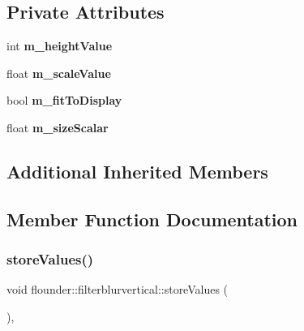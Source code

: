 \subsection*{Private Attributes}
\begin{DoxyCompactItemize}
\item 
\mbox{\label{classflounder_1_1filterblurvertical_ae12de62dab1a199092838d7d8401904a}} 
int {\bfseries m\+\_\+height\+Value}
\item 
\mbox{\label{classflounder_1_1filterblurvertical_a0fffea96668635a54361a32fe065848a}} 
float {\bfseries m\+\_\+scale\+Value}
\item 
\mbox{\label{classflounder_1_1filterblurvertical_a9c94d85b9b6a6870f0202d95b1753850}} 
bool {\bfseries m\+\_\+fit\+To\+Display}
\item 
\mbox{\label{classflounder_1_1filterblurvertical_a03c3471d445c686e901bf519fbe6e414}} 
float {\bfseries m\+\_\+size\+Scalar}
\end{DoxyCompactItemize}
\subsection*{Additional Inherited Members}


\subsection{Member Function Documentation}
\mbox{\label{classflounder_1_1filterblurvertical_acdc191b6c9b067c9619055c1672dd2e5}} 
\subsubsection{\texorpdfstring{store\+Values()}{storeValues()}}
{\footnotesize\ttfamily void flounder\+::filterblurvertical\+::store\+Values (\begin{DoxyParamCaption}{ }\end{DoxyParamCaption})\hspace{0.3cm}{\ttfamily [override]}, {\ttfamily [virtual]}}



